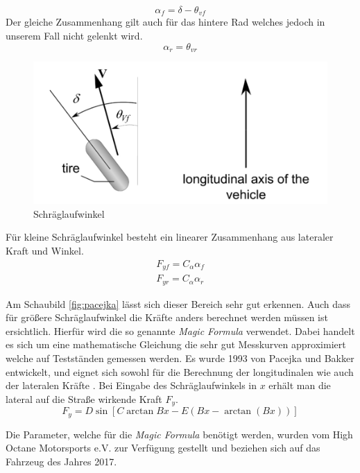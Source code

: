 \documentclass{like}
\begin{document}
\begin{equation}
\alpha_f = \delta - \theta_{vf}
\end{equation}
Der gleiche Zusammenhang gilt auch für das hintere Rad welches jedoch in unserem Fall nicht gelenkt wird.
\begin{equation}
\alpha_r = \theta_{vr}
\end{equation}


\begin{figure}[ht!]
	\includegraphics[width=400pt]{Abbildungen/linLat.png}
	\caption{Schräglaufwinkel}
	\label{fig:linLat}
\end{figure}




Für kleine Schräglaufwinkel besteht ein linearer Zusammenhang aus lateraler Kraft und Winkel. 
\begin{eqnarray}
F_{yf} = C_\alpha \alpha_f \\
F_{yr} = C_\alpha \alpha_r
\end{eqnarray}

Am Schaubild \ref{fig:pacejka} lässt sich dieser Bereich sehr gut erkennen.
Auch dass für größere Schräglaufwinkel die Kräfte anders berechnet werden müssen ist ersichtlich. Hierfür wird die so genannte \textit{Magic Formula}  \cite{magicFormula} verwendet. Dabei handelt es sich um eine mathematische Gleichung die sehr gut Messkurven approximiert welche auf Testständen gemessen werden.
Es wurde 1993 von Pacejka und Bakker entwickelt, und eignet sich sowohl für die Berechnung der longitudinalen wie auch der lateralen Kräfte . Bei Eingabe des Schräglaufwinkels in \(x\) erhält man die lateral auf die Straße wirkende Kraft \(F_y\). 
 \begin{equation}
 F_y = D\sin[C\arctan{Bx - E(Bx - \arctan(Bx))}]
 \label{eq:magicF}
 \end{equation}
 
Die Parameter, welche für die \textit{Magic Formula} benötigt werden, wurden vom High Octane Motorsports e.V. zur Verfügung gestellt und beziehen sich auf das Fahrzeug des Jahres 2017.
 
\end{document}
